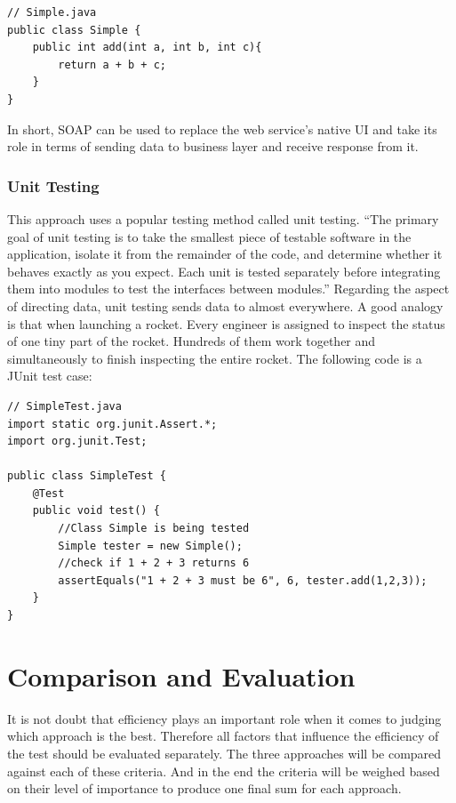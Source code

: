 \documentclass[12pt]{article}
\begin{document}
\begin{lstlisting}
// Simple.java
public class Simple {
	public int add(int a, int b, int c){
		return a + b + c;
	}
}

\end{lstlisting}

In short, SOAP can be used to replace the web service's native UI and take its role in terms of sending data to business layer and receive response from it.

\subsubsection{Unit Testing}
This approach uses a popular testing method called unit testing. “The primary goal of unit testing is to take the smallest piece of testable software in the application, isolate it from the remainder of the code, and determine whether it behaves exactly as you expect. Each unit is tested separately before integrating them into modules to test the interfaces between modules.”\cite{unit} Regarding the aspect of directing data, unit testing sends data to almost everywhere. A good analogy is that when launching a rocket. Every engineer is assigned to inspect the status of one tiny part of the rocket. Hundreds of them work together and simultaneously to finish inspecting the entire rocket. The following code is a JUnit test case:\\
\begin{lstlisting}
// SimpleTest.java
import static org.junit.Assert.*;
import org.junit.Test;

public class SimpleTest {
	@Test
	public void test() {
		//Class Simple is being tested
		Simple tester = new Simple();
		//check if 1 + 2 + 3 returns 6
		assertEquals("1 + 2 + 3 must be 6", 6, tester.add(1,2,3));
	}
}
\end{lstlisting}
\newpage

\section{Comparison and Evaluation}
It is not doubt that efficiency plays an important role when it comes to judging which approach is the best. Therefore all factors that influence the efficiency of the test should be evaluated separately.  The three approaches will be compared against each of these criteria. And in the end the criteria will be weighed based on their level of importance to produce one final sum for each approach.\\
\end{document}
